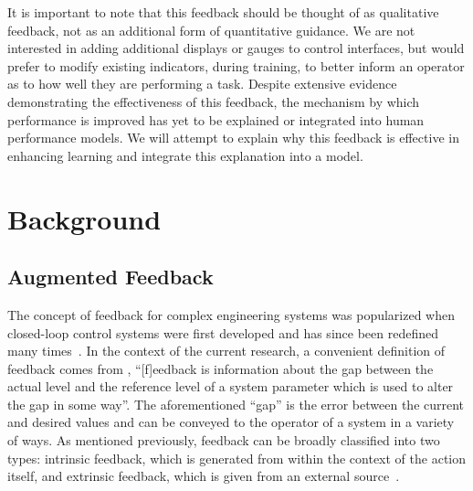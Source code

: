 It is important to note that this feedback should be thought of as qualitative feedback, not as an additional form of quantitative guidance.
We are not interested in adding additional displays or gauges to control interfaces, but would prefer to modify existing indicators, during training, to better inform an operator as to how well they are performing a task.
Despite extensive evidence demonstrating the effectiveness of this feedback, the mechanism by which performance is improved has yet to be explained or integrated into human performance models.
We will attempt to explain why this feedback is effective in enhancing learning and integrate this explanation into a model.

\section{Background}

\subsection{Augmented Feedback}

The concept of feedback for complex engineering systems was popularized when closed-loop control systems were first developed and has since been redefined many times~\citep{Wierner1948}.
In the context of the current research, a convenient definition of feedback comes from \citeauthor{ramaprasad_definition_1983}, ``[f]eedback is information about the gap between the actual level and the reference level of a system parameter which is used to alter the gap in some way''.
The aforementioned ``gap'' is the error between the current and desired values and can be conveyed to the operator of a system in a variety of ways.
As mentioned previously, feedback can be broadly classified into two types: intrinsic feedback, which is generated from within the context of the action itself, and extrinsic feedback, which is given from an external source~\citep{laurillard_rethinking_2002}.

